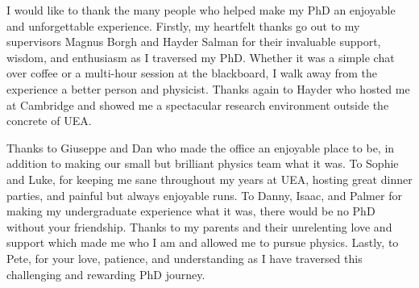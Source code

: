 I would like to thank the many people who helped make my PhD an enjoyable
and unforgettable experience.
Firstly, my heartfelt thanks go out to my supervisors Magnus Borgh and Hayder
Salman for their invaluable support, wisdom, and enthusiasm as I traversed my
PhD.
Whether it was a simple chat over coffee or a multi-hour session at the
blackboard, I walk away from the experience a better person and physicist.
Thanks again to Hayder who hosted me at Cambridge and showed me a spectacular
research environment outside the concrete of UEA\@.

Thanks to Giuseppe and Dan who made the office an enjoyable place to be, in
addition to making our small but brilliant physics team what it was.
To Sophie and Luke, for keeping me sane throughout my years at UEA, hosting
great dinner parties, and painful but always enjoyable runs.
To Danny, Isaac, and Palmer for making my undergraduate experience what it was,
there would be no PhD without your friendship.
Thanks to my parents and their unrelenting love and support which made me who I
am and allowed me to pursue physics.
Lastly, to Pete, for your love, patience, and understanding as I have traversed
this challenging and rewarding PhD journey.